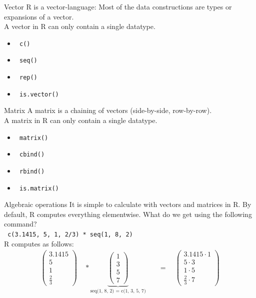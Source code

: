 \documentclass[aspectratio = 169]{chariteBeamer}
\begin{document}
\begin{frame}[fragile]{Vector}
	R is a vector-language: Most of the data constructions are types or expansions of a vector.\\
	A vector in R can only contain a single datatype.
	\begin{itemize}
		\item \verb+ c()+
		\item \verb+ seq()+
		\item \verb+ rep()+
		\item \verb+ is.vector()+
	\end{itemize}
\end{frame}

\begin{frame}[fragile]{Matrix}
	A matrix is a chaining of vectors (side-by-side, row-by-row).\\
	A matrix in R can only contain a single datatype.
	\begin{itemize}
		\item \verb+ matrix()+
		\item \verb+ cbind()+
		\item \verb+ rbind()+
		\item \verb+ is.matrix()+
	\end{itemize}
\end{frame}

\begin{frame}[fragile]{Algebraic operations}
It is simple to calculate with vectors and matrices in R. By default, R computes everything elementwise. What do we get using the following command?\\
\verb+ c(3.1415, 5, 1, 2/3) * seq(1, 8, 2)+ \\
R computes as follows: \begin{align*}
	\begin{pmatrix}
	3.1415 \\ 5 \\ 1 \\ \frac{2}{3}
	\end{pmatrix} \quad * 
	\underbrace{\begin{pmatrix}
		1 \\ 3 \\ 5 \\ 7
	\end{pmatrix}}_{\text{seq(1, 8, 2) = c(1, 3, 5, 7)}}
	\quad &= \quad \begin{pmatrix}
	3.1415 \cdot 1 \\
	5 \cdot 3 \\
	1 \cdot 5 \\
	\frac{2}{3} \cdot 7
	\end{pmatrix}
\end{align*}
\end{frame}
\end{document}
